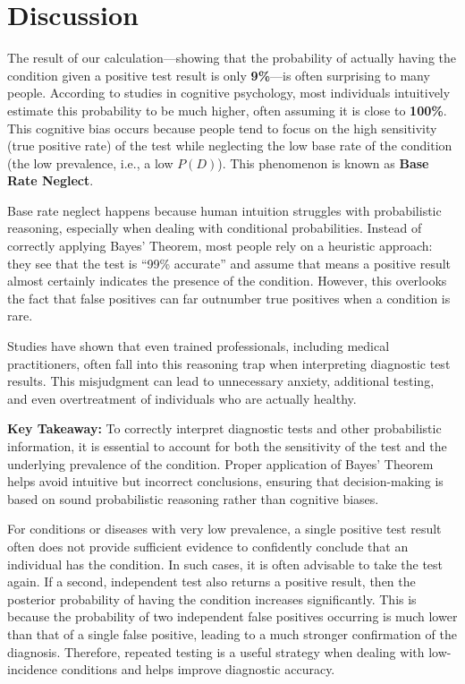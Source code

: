 \documentclass{article}
\begin{document}
\section{Discussion}

The result of our calculation—showing that the probability of actually having the condition given a positive test result is only \textbf{9\%}—is often surprising to many people. According to studies in cognitive psychology, most individuals intuitively estimate this probability to be much higher, often assuming it is close to \textbf{100\%}. This cognitive bias occurs because people tend to focus on the high sensitivity (true positive rate) of the test while neglecting the low base rate of the condition (the low prevalence, i.e., a low $P(D)$). This phenomenon is known as \textbf{Base Rate Neglect}.

Base rate neglect happens because human intuition struggles with probabilistic reasoning, especially when dealing with conditional probabilities. Instead of correctly applying Bayes’ Theorem, most people rely on a heuristic approach: they see that the test is “99\% accurate” and assume that means a positive result almost certainly indicates the presence of the condition. However, this overlooks the fact that false positives can far outnumber true positives when a condition is rare.

Studies have shown that even trained professionals, including medical practitioners, often fall into this reasoning trap when interpreting diagnostic test results. This misjudgment can lead to unnecessary anxiety, additional testing, and even overtreatment of individuals who are actually healthy.

\textbf{Key Takeaway:} To correctly interpret diagnostic tests and other probabilistic information, it is essential to account for both the sensitivity of the test and the underlying prevalence of the condition. Proper application of Bayes’ Theorem helps avoid intuitive but incorrect conclusions, ensuring that decision-making is based on sound probabilistic reasoning rather than cognitive biases.

For conditions or diseases with very low prevalence, a single positive test result often does not provide sufficient evidence to confidently conclude that an individual has the condition. In such cases, it is often advisable to take the test again. If a second, independent test also returns a positive result, then the posterior probability of having the condition increases significantly. This is because the probability of two independent false positives occurring is much lower than that of a single false positive, leading to a much stronger confirmation of the diagnosis. Therefore, repeated testing is a useful strategy when dealing with low-incidence conditions and helps improve diagnostic accuracy.
\end{document}

